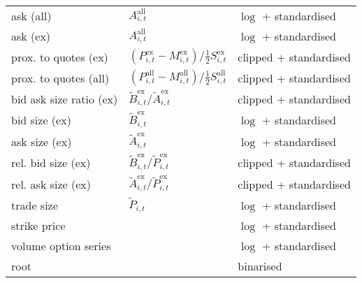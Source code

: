 \begin{table}[H]
\begin{threeparttable}
\begin{tabular}{@{}lll@{}}
            ask (all)               & $A_{i, t}^{\text{all}}$                                                                          & $\log$ + standardised          \\
            ask (ex)                & $A_{i, t}^{\text{all}}$                                                                          & $\log$ + standardised          \\
            prox. to quotes (ex)    & $\left(P_{i, t}^{\text{ex}}- M_{i, t}^{\text{ex}}\right) / \tfrac{1}{2} S_{i, t}^{\text{ex}}$    & clipped + standardised          \\
            prox. to quotes (all)   & $\left(P_{i, t}^{\text{all}}- M_{i, t}^{\text{all}}\right) / \tfrac{1}{2} S_{i, t}^{\text{all}}$ & clipped + standardised          \\
            bid ask size ratio (ex) & $\tilde{B}_{i, t}^{\text{ex}}/\tilde{A}_{i, t}^{\text{ex}}$                                      & clipped + standardised          \\
            bid size (ex)           & $\tilde{B}_{i, t}^{\text{ex}}$                                                                   & $\log$ + standardised          \\
            ask size (ex)           & $\tilde{A}_{i, t}^{\text{ex}}$                                                                   & $\log$ + standardised          \\
            rel. bid size (ex)      & $\tilde{B}_{i, t}^{\text{ex}}/\tilde{P}_{i, t}^{\text{ex}}$                                      & clipped + standardised           \\
            rel. ask size (ex)      & $\tilde{A}_{i, t}^{\text{ex}}/\tilde{P}_{i, t}^{\text{ex}}$                                      & clipped + standardised           \\
            trade size              & $\tilde{P}_{i, t}$                                                                               & $\log$ + standardised           \\
            strike price            &                                                                                                  & $\log$ + standardised           \\
            volume option series    &                                                                                                  & $\log$ + standardised           \\
            root                    &                                                                                                  & binarised          \\

\end{tabular}
\end{threeparttable}
\end{table}

